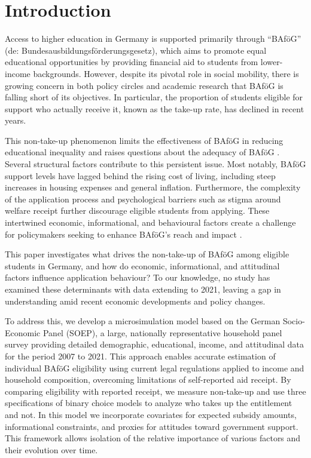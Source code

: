 \section{Introduction} \label{sec:intro}
Access to higher education in Germany is supported primarily through ``BAföG'' (de: Bundesausbildungsförderungsgesetz), which aims to promote equal educational opportunities by providing financial aid to students from lower-income backgrounds. 
However, despite its pivotal role in social mobility, there is growing concern in both policy circles and academic research that BAföG is falling short of its objectives. 
In particular, the proportion of students eligible for support who actually receive it, known as the take-up rate, has declined in recent years. 

This non-take-up phenomenon limits the effectiveness of BAföG in reducing educational inequality and raises questions about the adequacy of BAföG \citep{gwosc_krisenbewaltigung_2022, meier_bafog_2024}. 
Several structural factors contribute to this persistent issue. 
Most notably, BAföG support levels have lagged behind the rising cost of living, including steep increases in housing expenses and general inflation.
Furthermore, the complexity of the application process and psychological barriers such as stigma around welfare receipt further discourage eligible students from applying. 
These intertwined economic, informational, and behavioural factors create a challenge for policymakers seeking to enhance BAföG’s reach and impact \citep{meier_bafog_2024, staack_von_2017}.

This paper investigates what drives the non-take-up of BAföG among eligible students in Germany, and how do economic, informational, and attitudinal factors influence application behaviour? 
To our knowledge, no study has examined these determinants with data extending to 2021, leaving a gap in understanding amid recent economic developments and policy changes.

To address this, we develop a microsimulation model based on the German Socio-Economic Panel (SOEP), a large, nationally representative household panel survey providing detailed demographic, educational, income, and attitudinal data for the period 2007 to 2021.
This approach enables accurate estimation of individual BAföG eligibility using current legal regulations applied to income and household composition, overcoming limitations of self-reported aid receipt. 
By comparing eligibility with reported receipt, we measure non-take-up and use three specifications of binary choice models to analyze who takes up the entitlement and not. 
In this model we incorporate covariates for expected subsidy amounts, informational constraints, and proxies for attitudes toward government support. 
This framework allows isolation of the relative importance of various factors and their evolution over time.

